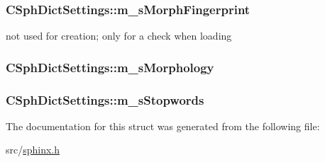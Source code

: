 \hypertarget{structCSphDictSettings_aee29d4b9f2a7087077c697966ebf9315}{
\subsubsection[{m\-\_\-s\-Morph\-Fingerprint}]{ C\-Sph\-Dict\-Settings\-::m\-\_\-s\-Morph\-Fingerprint}}\label{structCSphDictSettings_aee29d4b9f2a7087077c697966ebf9315}


not used for creation; only for a check when loading 

\hypertarget{structCSphDictSettings_a2240977fc5d354804a9f9066b020455b}{
\subsubsection[{m\-\_\-s\-Morphology}]{ C\-Sph\-Dict\-Settings\-::m\-\_\-s\-Morphology}}\label{structCSphDictSettings_a2240977fc5d354804a9f9066b020455b}
\hypertarget{structCSphDictSettings_a34eb75d4352e975a4e9e8527b12c9147}{
\subsubsection[{m\-\_\-s\-Stopwords}]{ C\-Sph\-Dict\-Settings\-::m\-\_\-s\-Stopwords}}\label{structCSphDictSettings_a34eb75d4352e975a4e9e8527b12c9147}


The documentation for this struct was generated from the following file\-:\begin{DoxyCompactItemize}
\item 
src/\hyperlink{sphinx_8h}{sphinx.\-h}\end{DoxyCompactItemize}
